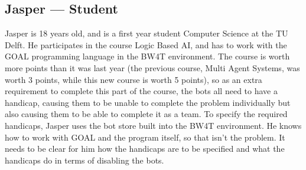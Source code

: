 \subsection{Jasper --- Student}
Jasper is 18 years old, and is a first year student Computer Science at the TU Delft. He participates in the course Logic Based AI, and has to work with the GOAL programming language in the BW4T environment. The course is worth more points than it was last year (the previous course, Multi Agent Systems, was worth 3 points, while this new course is worth 5 points), so as an extra requirement to complete this part of the course, the bots all need to have a handicap, causing them to be unable to complete the problem individually but also causing them to be able to complete it as a team. To specify the required handicaps, Jasper uses the bot store built into the BW4T environment. 
He knows how to work with GOAL and the program itself, so that isn’t the problem. It needs to be clear for him how the handicaps are to be specified and what the handicaps do in terms of disabling the bots.
